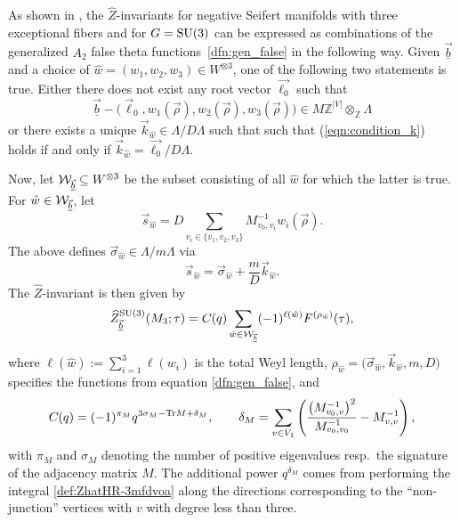 \documentclass[10pt,a4paper]{amsart}
\def\BZ{\mathbb{Z}}
\theoremstyle{definition}
\numberwithin{equation}{section}
\begin{document}
As shown in \cite{chengUpC}, the $\widehat Z$-invariants for negative Seifert manifolds with three exceptional fibers and for $G={\rm SU}(3)$ can be expressed as combinations of the generalized $A_2$ false theta functions~\eqref{dfn:gen_false} in the following way.
Given $\vec{\underline{b}}$ and a choice of $\hat w= (w_1,w_2,w_3)\in W^{\otimes 3}$, one of the following two statements is true. Either there does not exist any root vector $\vec{\ell_0}$ such that
\begin{equation}\label{eqn:condition_k}
 \vec{\underline{b}}- \bigl(\vec{\ell}_0,w_1(\vec{\rho}),w_2(\vec{\rho}),w_3(\vec{\rho})\bigr)\in M\BZ^{\left|V\right|}\otimes_{\BZ}\Lambda
\end{equation}
or there exists a unique $\vec k_{\hat w} \in \Lambda/D\Lambda$ such that such that (\ref{eqn:condition_k}) holds if and only if $\vec k_{\hat w}= \vec{\ell_0}/D\Lambda$.

Now, let ${\cal W}_{\vec{\underline{b}}} \subseteq W^{\otimes 3}$ be the subset consisting of all $\hat w$ for which the latter is true. For $\hat w\in {\cal W}_{\vec{\underline{b}}}$, let
\begin{equation*}%
\vec{s}_{\hat{w}} = D\sum\limits_{v_i \in \{v_1,v_2,v_3\}}
M^{-1}_{v_0,v_i}w_i(\vec{\rho}) .
\end{equation*}
The above defines $\vec{\sigma}_{\hat{w}}\in\Lambda/m\Lambda$ via
\[\vec{s}_{\hat{w}}= \vec{\sigma}_{\hat{w}}+\frac{m}{D} \vec{k}_{\hat{w}}. \]
The $\widehat Z$-invariant is then given by
\begin{equation}\label{s3:hombl-2}
\widehat{Z}^{{\rm SU}(3)}_{\vec{\underline{b}}}(M_3;\tau) =
C_{}(q)
\sum_{\hat{w}\in {\cal W}_{\vec{\underline{b}}} }
(-1)^{\ell (\hat{w})} F^{(\rho_{\hat w})} (\tau),
\end{equation}
where ${\ell (\hat{w})} := \sum_{i=1}^3 {\ell ({w_i})}$ is the total Weyl length, $\rho_{\hat w}=\bigl(\vec{\sigma}_{\hat{w}},\vec{k}_{\hat{w}},m,D\bigr)$ specifies the functions  from equation \eqref{dfn:gen_false}, and
\[ %
C_{}(q) = (-1)^{\pi_M} q^{3\sigma_M-{\rm Tr}M+\delta_M},\qquad
 \delta_{M}= \sum_{v\in V_{1}}\left( \frac{\left( M^{-1}_{v_{0},v} \right)^{2}}{M^{-1}_{v_0,v_0}}-M^{-1}_{v,v} \right),
\]
with $\pi_M$ and $\sigma_M$ denoting the number of positive eigenvalues resp.\ the signature of the adjacency matrix $M$. The additional power $q^{\delta_M}$ comes from performing the integral \eqref{def:ZhatHR-3mfdvoa} along the directions corresponding to the ``non-junction'' vertices with $v$ with degree less than three.
\end{document}
